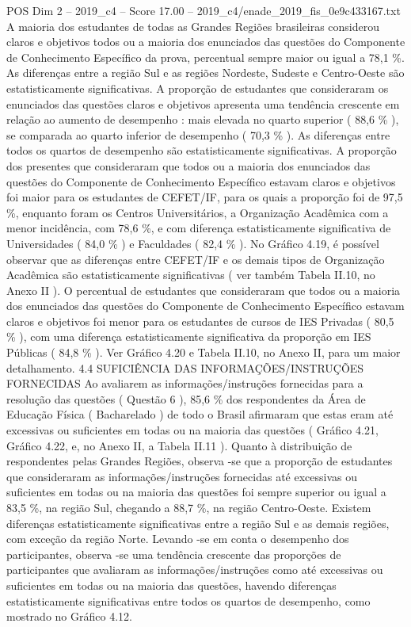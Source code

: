 \begin{textsample}{POS Dim 2 – 2019\_c4 – Score 17.00 – 2019\_c4/enade\_2019\_fis\_0e9c433167.txt}
A maioria dos estudantes de todas as Grandes Regiões brasileiras considerou claros e objetivos todos ou a maioria dos enunciados das questões do Componente de Conhecimento Específico da prova, percentual sempre maior ou igual a 78,1 \%.
As diferenças entre a região Sul e as regiões Nordeste, Sudeste e Centro-Oeste são estatisticamente significativas.
A proporção de estudantes que consideraram os enunciados das questões claros e objetivos apresenta uma tendência crescente em relação ao aumento de desempenho : mais elevada no quarto superior ( 88,6 \% ), se comparada ao quarto inferior de desempenho ( 70,3 \% ).
As diferenças entre todos os quartos de desempenho são estatisticamente significativas.
A proporção dos presentes que consideraram que todos ou a maioria dos enunciados das questões do Componente de Conhecimento Específico estavam claros e objetivos foi maior para os estudantes de CEFET/IF, para os quais a proporção foi de 97,5 \%, enquanto foram os Centros Universitários, a Organização Acadêmica com a menor incidência, com 78,6 \%, e com diferença estatisticamente significativa de Universidades ( 84,0 \% ) e Faculdades ( 82,4 \% ).
No Gráfico 4.19, é possível observar que as diferenças entre CEFET/IF e os demais tipos de Organização Acadêmica são estatisticamente significativas ( ver também Tabela II.10, no Anexo II ).
O percentual de estudantes que consideraram que todos ou a maioria dos enunciados das questões do Componente de Conhecimento Específico estavam claros e objetivos foi menor para os estudantes de cursos de IES Privadas ( 80,5 \% ), com uma diferença estatisticamente significativa da proporção em IES Públicas ( 84,8 \% ).
Ver Gráfico 4.20 e Tabela II.10, no Anexo II, para um maior detalhamento. 4.4 SUFICIÊNCIA DAS INFORMAÇÕES/INSTRUÇÕES FORNECIDAS Ao avaliarem as informações/instruções fornecidas para a resolução das questões ( Questão 6 ), 85,6 \% dos respondentes da Área de Educação Física ( Bacharelado ) de todo o Brasil afirmaram que estas eram até excessivas ou suficientes em todas ou na maioria das questões ( Gráfico 4.21, Gráfico 4.22, e, no Anexo II, a Tabela II.11 ).
Quanto à distribuição de respondentes pelas Grandes Regiões, observa -se que a proporção de estudantes que consideraram as informações/instruções fornecidas até excessivas ou suficientes em todas ou na maioria das questões foi sempre superior ou igual a 83,5 \%, na região Sul, chegando a 88,7 \%, na região Centro-Oeste.
Existem diferenças estatisticamente significativas entre a região Sul e as demais regiões, com exceção da região Norte.
Levando -se em conta o desempenho dos participantes, observa -se uma tendência crescente das proporções de participantes que avaliaram as informações/instruções como até excessivas ou suficientes em todas ou na maioria das questões, havendo diferenças estatisticamente significativas entre todos os quartos de desempenho, como mostrado no Gráfico 4.12.

\end{textsample}
